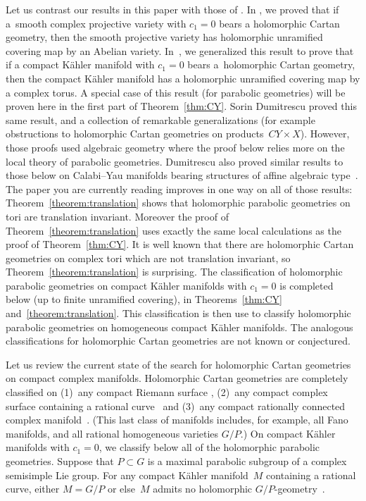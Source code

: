 \documentclass[pdftex]{sigma}
\begin{document}
Let us contrast our results in this paper with those
of \cite{Biswas/McKay:2010a,Biswas/McKay:2010b,Dumitrescu:2010}.
In \cite{Biswas/McKay:2010a},
we proved that if a~smooth complex projective variety
with $c_1=0$ bears a holomorphic Cartan geometry, then the
smooth projective variety has holomorphic unramif\/ied covering
map by an Abelian variety. In~\cite{Biswas/McKay:2010b},
we generalized this result to prove that
if a compact K{\"a}hler manifold with $c_1=0$
bears a~holomorphic Cartan geometry, then the
compact K{\"a}hler manifold has a holomorphic unramif\/ied covering
map by a complex torus. A special case of this result
(for parabolic geometries) will be proven
here in the f\/irst part of Theorem~\ref{thm:CY}.
Sorin Dumitrescu proved this same result,
and a collection of remarkable generalizations (for
example obstructions to holomorphic
Cartan geometries on products~$CY \times X$).
However, those proofs used algebraic geometry
where the proof below relies more on the local theory
of parabolic geometries. Dumitrescu also
proved similar results to those below
on Calabi--Yau manifolds bearing
structures of af\/f\/ine algebraic type~\cite{Dumitrescu:2001}.
The paper you are currently reading improves in one way
on all of those results:  Theorem~\ref{theorem:translation}
shows that holomorphic parabolic geometries
on tori are translation invariant. Moreover the proof
of Theorem~\ref{theorem:translation} uses exactly
the same local calculations as the proof of Theorem~\ref{thm:CY}.
It is well known
that there are holomorphic Cartan geometries on complex
tori which are not translation invariant, so Theorem~\ref{theorem:translation}
is surprising. The
classif\/ication of holomorphic parabolic geometries
on compact K{\"a}hler manifolds with $c_1=0$
is completed below (up to f\/inite unramif\/ied covering),
in Theorems~\ref{thm:CY} and~\ref{theorem:translation}.
This classif\/ication is then use to classify
holomorphic parabolic geometries on homogeneous
compact K{\"a}hler manifolds.
The analogous classif\/ications for holomorphic Cartan
geometries are not known or conjectured.

Let us review the current state of the search
for holomorphic Cartan geometries on compact
complex manifolds. Holomorphic Cartan geometries
are completely classif\/ied on (1)~any compact Riemann
surface \cite{McKay:2011}, (2)~any compact
complex surface containing a rational curve~\cite{McKay:2011}
and (3)~any
compact rationally connected complex manifold~\cite{Biswas/McKay:2010c}. (This last class of manifolds
includes, for example, all Fano manifolds, and all
rational homogeneous varieties $G/P$.)
On compact K{\"a}hler manifolds with $c_1=0$, we classify
below all of the holomorphic parabolic geometries.
Suppose that $P \subset G$ is a maximal parabolic subgroup
of a complex semisimple Lie group.
For any compact K{\"a}hler manifold~$M$ containing a rational
curve, either $M=G/P$ or else~$M$ admits no holomorphic $G/P$-geometry~\cite{Biswas/McKay:2010c}.
\end{document}
